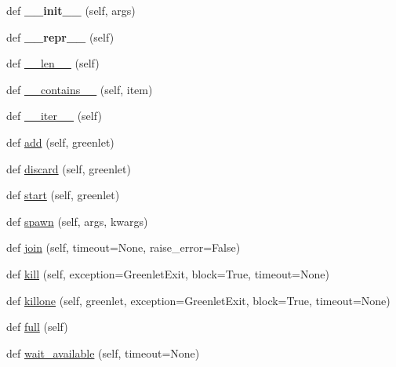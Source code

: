 \begin{DoxyCompactItemize}
\item 
\mbox{\label{classgevent_1_1pool_1_1_group_a19d8f7197b5759ba30170538e8da8d52}} 
def {\bfseries \+\_\+\+\_\+init\+\_\+\+\_\+} (self, args)
\item 
\mbox{\label{classgevent_1_1pool_1_1_group_adb632ad759844cecd1b55df1390ffa21}} 
def {\bfseries \+\_\+\+\_\+repr\+\_\+\+\_\+} (self)
\item 
def \hyperlink{classgevent_1_1pool_1_1_group_afae785c70abd12596435a98fa2440d55}{\+\_\+\+\_\+len\+\_\+\+\_\+} (self)
\item 
def \hyperlink{classgevent_1_1pool_1_1_group_ae6fb0617f6960e9d013e20d4a41ee4cf}{\+\_\+\+\_\+contains\+\_\+\+\_\+} (self, item)
\item 
def \hyperlink{classgevent_1_1pool_1_1_group_a813354827619c66daf0d1ab2acef81e3}{\+\_\+\+\_\+iter\+\_\+\+\_\+} (self)
\item 
def \hyperlink{classgevent_1_1pool_1_1_group_a2e4dea7c78ceebc47140efd42b420b73}{add} (self, greenlet)
\item 
def \hyperlink{classgevent_1_1pool_1_1_group_a72d55b247f93a2ce245f579e39e489a0}{discard} (self, greenlet)
\item 
def \hyperlink{classgevent_1_1pool_1_1_group_a50496ebf90113d8b8388e84b36be820d}{start} (self, greenlet)
\item 
def \hyperlink{classgevent_1_1pool_1_1_group_a17b15e843e0b151a3906c2f2c2167f55}{spawn} (self, args, kwargs)
\item 
def \hyperlink{classgevent_1_1pool_1_1_group_ad368620ebda7dee3d34b0d62ffbc9dfd}{join} (self, timeout=None, raise\+\_\+error=False)
\item 
def \hyperlink{classgevent_1_1pool_1_1_group_ada2edb0aaef544992fa1c967e1d2094f}{kill} (self, exception=Greenlet\+Exit, block=True, timeout=None)
\item 
def \hyperlink{classgevent_1_1pool_1_1_group_a8aaf4090368477a74d27d866cd1e0a9b}{killone} (self, greenlet, exception=Greenlet\+Exit, block=True, timeout=None)
\item 
def \hyperlink{classgevent_1_1pool_1_1_group_a60ab870aee8f8e804b272e4b36d8a4fc}{full} (self)
\item 
def \hyperlink{classgevent_1_1pool_1_1_group_af9ad7f7c08e17a7b40aaa7dab049466a}{wait\+\_\+available} (self, timeout=None)
\end{DoxyCompactItemize}

